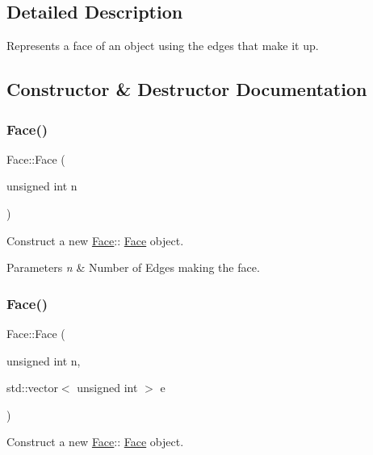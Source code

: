 \subsection{Detailed Description}
Represents a face of an object using the edges that make it up. 

\subsection{Constructor \& Destructor Documentation}
\mbox{\label{structFace_af63f8976d1835512afc86f7211112b65}} 
\subsubsection{\texorpdfstring{Face()}{Face()}\hspace{0.1cm}{\footnotesize\ttfamily [1/2]}}
{\footnotesize\ttfamily Face\+::\+Face (\begin{DoxyParamCaption}\item[{unsigned int}]{n }\end{DoxyParamCaption})}



Construct a new \hyperlink{structFace}{Face}\+:\+: \hyperlink{structFace}{Face} object. 


\begin{DoxyParams}{Parameters}
{\em n} & Number of Edges making the face. \\
\hline
\end{DoxyParams}
\mbox{\label{structFace_af66f3b634d0899385a9f9235134f64aa}} 
\subsubsection{\texorpdfstring{Face()}{Face()}\hspace{0.1cm}{\footnotesize\ttfamily [2/2]}}
{\footnotesize\ttfamily Face\+::\+Face (\begin{DoxyParamCaption}\item[{unsigned int}]{n,  }\item[{std\+::vector$<$ unsigned int $>$}]{e }\end{DoxyParamCaption})}



Construct a new \hyperlink{structFace}{Face}\+:\+: \hyperlink{structFace}{Face} object. 


